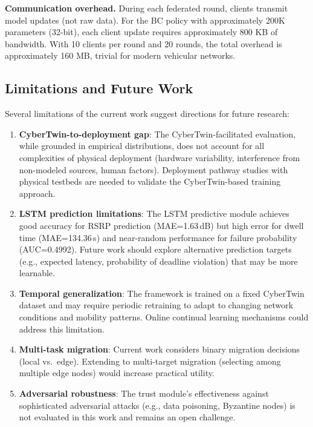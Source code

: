\documentclass[10pt,letterpaper]{article}
\begin{document}
\textbf{Communication overhead.} During each federated round, clients transmit model updates (not raw data). For the BC policy with approximately 200K parameters (32-bit), each client update requires approximately 800 KB of bandwidth. With 10 clients per round and 20 rounds, the total overhead is approximately 160 MB, trivial for modern vehicular networks.

\subsection*{Limitations and Future Work}

Several limitations of the current work suggest directions for future research:

\begin{enumerate}
    \item \textbf{CyberTwin-to-deployment gap}: The CyberTwin-facilitated evaluation, while grounded in empirical distributions, does not account for all complexities of physical deployment (hardware variability, interference from non-modeled sources, human factors). Deployment pathway studies with physical testbeds are needed to validate the CyberTwin-based training approach.

    \item \textbf{LSTM prediction limitations}: The LSTM predictive module achieves good accuracy for RSRP prediction (MAE=1.63\,dB) but high error for dwell time (MAE=134.36\,s) and near-random performance for failure probability (AUC=0.4992). Future work should explore alternative prediction targets (e.g., expected latency, probability of deadline violation) that may be more learnable.

    \item \textbf{Temporal generalization}: The framework is trained on a fixed CyberTwin dataset and may require periodic retraining to adapt to changing network conditions and mobility patterns. Online continual learning mechanisms could address this limitation.

    \item \textbf{Multi-task migration}: Current work considers binary migration decisions (local vs.\ edge). Extending to multi-target migration (selecting among multiple edge nodes) would increase practical utility.

    \item \textbf{Adversarial robustness}: The trust module's effectiveness against sophisticated adversarial attacks (e.g., data poisoning, Byzantine nodes) is not evaluated in this work and remains an open challenge.


\end{enumerate}
\end{document}
